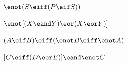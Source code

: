 \begin{earg}

\item $\enot (S \eiff (P \eif S))$



 \item $\enot [(X \eand Y) \eor (X \eor Y)]$



\item $(A \eif B) \eiff (\enot B\eiff \enot A)$

\item $[C \eiff (D \eor E)] \eand \enot C$



\end{earg}
